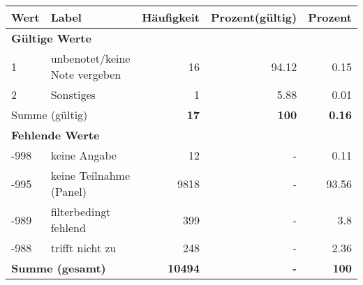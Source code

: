      \begin{longtable}{lXrrr}
     \toprule
     \textbf{Wert} & \textbf{Label} & \textbf{Häufigkeit} & \textbf{Prozent(gültig)} & \textbf{Prozent} \\
     \endhead
     \midrule
     \multicolumn{5}{l}{\textbf{Gültige Werte}}\\

     1 &
     \multicolumn{1}{X}{ unbenotet/keine Note vergeben   } &


       \num{16} &
       \num[round-mode=places,round-precision=2]{94.12} &
         \num[round-mode=places,round-precision=2]{0.15} \\

     2 &
     \multicolumn{1}{X}{ Sonstiges   } &


       \num{1} &
       \num[round-mode=places,round-precision=2]{5.88} &
         \num[round-mode=places,round-precision=2]{0.01} \\
     \midrule
     \multicolumn{2}{l}{Summe (gültig)} &
       \textbf{\num{17}} &
     \textbf{\num{100}} &
       \textbf{\num[round-mode=places,round-precision=2]{0.16}} \\
     \multicolumn{5}{l}{\textbf{Fehlende Werte}}\\
       -998 &
       keine Angabe &
         \num{12} &
        - &
         \num[round-mode=places,round-precision=2]{0.11} \\
       -995 &
       keine Teilnahme (Panel) &
         \num{9818} &
        - &
         \num[round-mode=places,round-precision=2]{93.56} \\
       -989 &
       filterbedingt fehlend &
         \num{399} &
        - &
         \num[round-mode=places,round-precision=2]{3.8} \\
       -988 &
       trifft nicht zu &
         \num{248} &
        - &
         \num[round-mode=places,round-precision=2]{2.36} \\
     \midrule
     \multicolumn{2}{l}{\textbf{Summe (gesamt)}} &
          \textbf{\num{10494}} &
        \textbf{-} &
        \textbf{\num{100}} \\
     \bottomrule
     \end{longtable}
     
